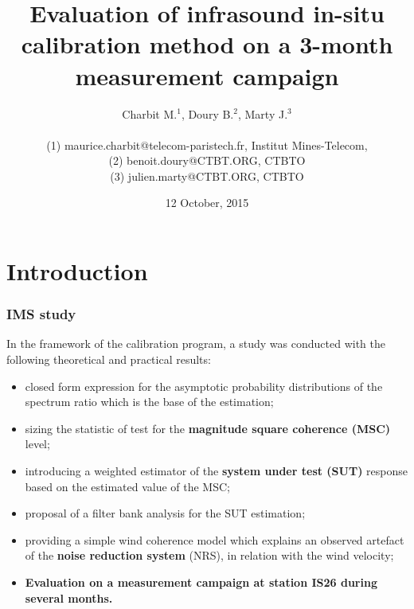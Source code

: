 \documentclass[handout,9pt]{beamer}
\title{Evaluation of infrasound in-situ calibration method on a 3-month measurement campaign}
\author{
 Charbit M.$^{1}$, 
 Doury B.$^{2}$,
 Marty J.$^{3}$
\\ \vspace{1cm}
\parbox{20cm}{ 
{\tiny  (1) maurice.charbit@telecom-paristech.fr, Institut Mines-Telecom},\\
{\tiny (2) benoit.doury@CTBT.ORG, CTBTO}\\
{\tiny (3) julien.marty@CTBT.ORG, CTBTO} }\vspace{-24pt}
}
\date{12 October, 2015}
\begin{document}
 \sloppy

\begin{frame}
\maketitle
\end{frame}


 \section{Introduction}
\begin{frame}
 \frametitle{IMS study}
 In the framework of the calibration program, a study was conducted 
 with the following theoretical and practical results:
 \begin{itemize}
 \item
 closed form expression for the asymptotic probability distributions of the spectrum ratio which is the base of the estimation;
 \item
 sizing the statistic of test for the {\bf  magnitude square coherence (MSC)} level;
 \item
 introducing a weighted estimator of the {\bf system under test (SUT)} response based on the estimated value of 
the MSC;
 \item
 proposal of a filter bank analysis for the SUT estimation;
 \item
 providing a simple wind coherence model which explains an observed artefact of the {\bf noise reduction system} (NRS), in relation with the wind velocity;
 \item
{\bf \color{red} Evaluation on a measurement campaign at station IS26 during several months.}
 \end{itemize}
 
 
\end{frame}
\end{document}
